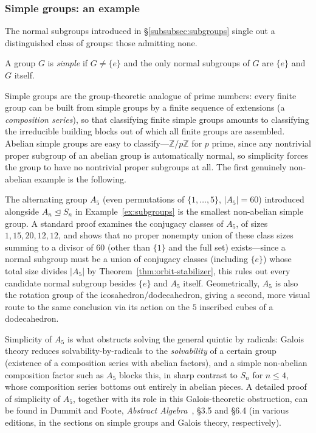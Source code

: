 \documentclass[mathematics,review,submit,moreauthors]{Definitions/mdpi}
\begin{document}

\subsubsection{Simple groups: an example}
\label{subsubsec:simple-groups}

The normal subgroups introduced in \S\ref{subsubsec:subgroups} single out a
distinguished class of groups: those admitting none.

\begin{Definition}
\label{def:simple-group}
A group $G$ is \emph{simple} if $G \neq \{e\}$ and the only normal subgroups
of $G$ are $\{e\}$ and $G$ itself.
\end{Definition}

Simple groups are the group-theoretic analogue of prime numbers: every
finite group can be built from simple groups by a finite sequence of
extensions (a \emph{composition series}), so that classifying finite simple
groups amounts to classifying the irreducible building blocks out of which
all finite groups are assembled. Abelian simple groups are easy to
classify---$\mathbb{Z}/p\mathbb{Z}$ for $p$ prime, since any nontrivial
proper subgroup of an abelian group is automatically normal, so simplicity
forces the group to have no nontrivial proper subgroups at all. The first
genuinely non-abelian example is the following.

\begin{Example}[$A_5$ is simple]
\label{ex:A5-simple}
The alternating group $A_5$ (even permutations of $\{1,\dots,5\}$,
$|A_5| = 60$) introduced alongside $A_n \trianglelefteq S_n$ in
Example~\ref{ex:subgroups} is the smallest non-abelian simple group. A
standard proof examines the conjugacy classes of $A_5$, of sizes
$1, 15, 20, 12, 12$, and shows that no proper nonempty union of these class
sizes summing to a divisor of $60$ (other than $\{1\}$ and the full set)
exists---since a normal subgroup must be a union of conjugacy classes
(including $\{e\}$) whose total size divides $|A_5|$ by
Theorem~\ref{thm:orbit-stabilizer}, this rules out every candidate normal
subgroup besides $\{e\}$ and $A_5$ itself. Geometrically, $A_5$ is also the
rotation group of the icosahedron/dodecahedron, giving a second,
more visual route to the same conclusion via its action on the $5$
inscribed cubes of a dodecahedron.

Simplicity of $A_5$ is what obstructs solving the general quintic by
radicals: Galois theory reduces solvability-by-radicals to the
\emph{solvability} of a certain group (existence of a composition series
with abelian factors), and a simple non-abelian composition factor such as
$A_5$ blocks this, in sharp contrast to $S_n$ for $n \leq 4$, whose
composition series bottoms out entirely in abelian pieces. A detailed proof
of simplicity of $A_5$, together with its role in this Galois-theoretic
obstruction, can be found in Dummit and Foote,
\emph{Abstract Algebra}~\cite{dummit2003}, \S 3.5 and \S 6.4 (in various
editions, in the sections on simple groups and Galois theory,
respectively).
\end{Example}
\end{document}
